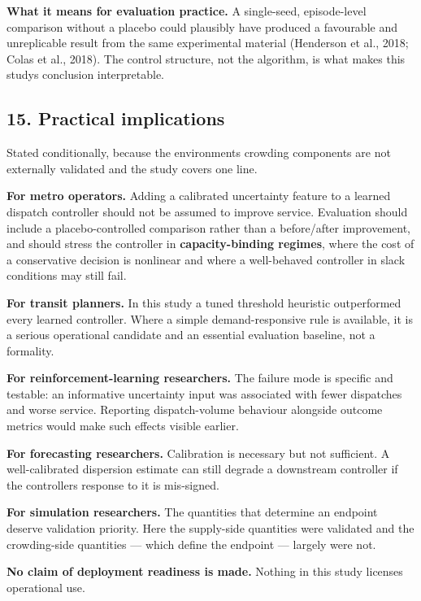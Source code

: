 \documentclass[
]{article}
\begin{document}
\textbf{What it means for evaluation practice.} A single-seed,
episode-level comparison without a placebo could plausibly have produced
a favourable and unreplicable result from the same experimental material
(Henderson et al., 2018; Colas et al., 2018). The control structure, not
the algorithm, is what makes this study\textquotesingle s conclusion
interpretable.

\subsection{15. Practical implications}\label{15-practical-implications}

Stated conditionally, because the environment\textquotesingle s crowding
components are not externally validated and the study covers one line.

\textbf{For metro operators.} Adding a calibrated uncertainty feature to
a learned dispatch controller should not be assumed to improve service.
Evaluation should include a placebo-controlled comparison rather than a
before/after improvement, and should stress the controller in
\textbf{capacity-binding regimes}, where the cost of a conservative
decision is nonlinear and where a well-behaved controller in slack
conditions may still fail.

\textbf{For transit planners.} In this study a tuned threshold heuristic
outperformed every learned controller. Where a simple demand-responsive
rule is available, it is a serious operational candidate and an
essential evaluation baseline, not a formality.

\textbf{For reinforcement-learning researchers.} The failure mode is
specific and testable: an informative uncertainty input was associated
with fewer dispatches and worse service. Reporting dispatch-volume
behaviour alongside outcome metrics would make such effects visible
earlier.

\textbf{For forecasting researchers.} Calibration is necessary but not
sufficient. A well-calibrated dispersion estimate can still degrade a
downstream controller if the controller\textquotesingle s response to it
is mis-signed.

\textbf{For simulation researchers.} The quantities that determine an
endpoint deserve validation priority. Here the supply-side quantities
were validated and the crowding-side quantities --- which define the
endpoint --- largely were not.

\textbf{No claim of deployment readiness is made.} Nothing in this study
licenses operational use.
\end{document}
